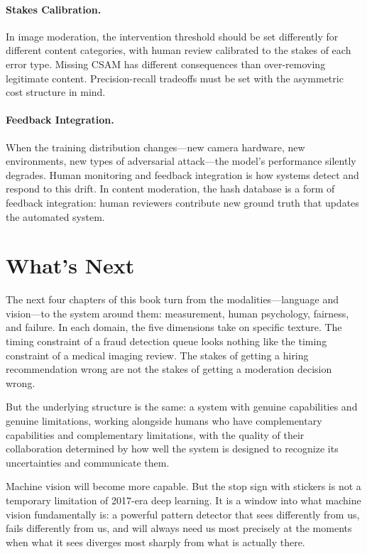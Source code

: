 \paragraph{Stakes Calibration.} In image moderation, the intervention threshold should be set differently for different content categories, with human review calibrated to the stakes of each error type. Missing CSAM has different consequences than over-removing legitimate content. Precision-recall tradeoffs must be set with the asymmetric cost structure in mind.

\paragraph{Feedback Integration.} When the training distribution changes---new camera hardware, new environments, new types of adversarial attack---the model's performance silently degrades. Human monitoring and feedback integration is how systems detect and respond to this drift. In content moderation, the hash database is a form of feedback integration: human reviewers contribute new ground truth that updates the automated system.

\section{What's Next}
\label{sec:ch11-next}

The next four chapters of this book turn from the modalities---language and vision---to the system around them: measurement, human psychology, fairness, and failure. In each domain, the five dimensions take on specific texture. The timing constraint of a fraud detection queue looks nothing like the timing constraint of a medical imaging review. The stakes of getting a hiring recommendation wrong are not the stakes of getting a moderation decision wrong.

But the underlying structure is the same: a system with genuine capabilities and genuine limitations, working alongside humans who have complementary capabilities and complementary limitations, with the quality of their collaboration determined by how well the system is designed to recognize its uncertainties and communicate them.

Machine vision will become more capable. But the stop sign with stickers is not a temporary limitation of 2017-era deep learning. It is a window into what machine vision fundamentally is: a powerful pattern detector that sees differently from us, fails differently from us, and will always need us most precisely at the moments when what it sees diverges most sharply from what is actually there.

